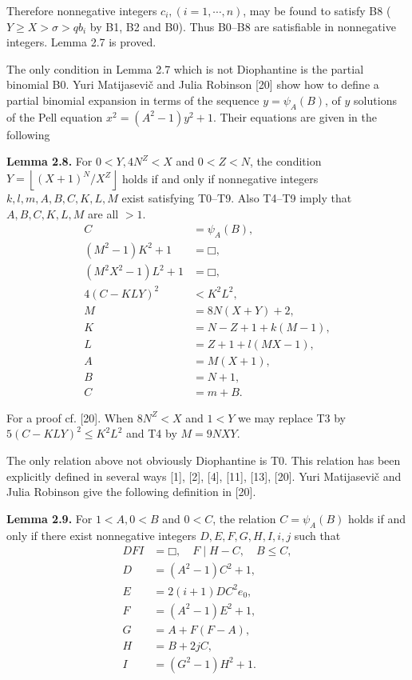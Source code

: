 \documentclass[11pt,a4paper]{article}
\newcommand{\square}{\mdlgwhtsquare}
\begin{document}
Therefore nonnegative integers $c_{i},(i=1, \cdots, n)$, may be found to satisfy B8 ( $Y \geq X>\sigma>q b_{i}$ by B1, B2 and B0). Thus B0--B8 are satisfiable in nonnegative integers. Lemma 2.7 is proved.

The only condition in Lemma 2.7 which is not Diophantine is the partial binomial B0. Yuri Matijasevič and Julia Robinson [20] show how to define a partial binomial expansion in terms of the sequence $y=\psi_{A}(B)$, of $y$ solutions of the Pell equation $x^{2}=\left(A^{2}-1\right) y^{2}+1$. Their equations are given in the following

\par{}\medskip\noindent\textbf{Lemma 2.8.} For $0<Y, 4 N^{Z}<X$ and $0<Z<N$, the condition $Y=\left\lfloor (X+1)^N/X^Z\right\rfloor$ holds if and only if nonnegative integers $k, l, m, A, B, C, K, L, M$ exist satisfying T0--T9. Also T4--T9 imply that $A, B, C, K, L, M$ are all $>1$.
\begin{align*}
C&=\psi_A(B), \tag{T0}\\
(M^2-1)K^2+1&=\square, \tag{T1}\\
(M^2X^2-1)L^2+1&=\square, \tag{T2}\\
4(C-KLY)^2&<K^2L^2, \tag{T3}\\
M&=8N(X+Y)+2, \tag{T4}\\
K&=N-Z+1+k(M-1), \tag{T5}\\
L&=Z+1+l(MX-1), \tag{T6}\\
A&=M(X+1), \tag{T7}\\
B&=N+1, \tag{T8}\\
C&=m+B. \tag{T9}
\end{align*}

For a proof cf. [20]. When $8 N^{Z}<X$ and $1<Y$ we may replace T3 by $5(C-K L Y)^{2} \leq K^{2} L^{2}$ and T4 by $M=9 N X Y$.

The only relation above not obviously Diophantine is T0. This relation has been explicitly defined in several ways [1], [2], [4], [11], [13], [20]. Yuri Matijasevič and Julia Robinson give the following definition in [20].

\par{}\medskip\noindent\textbf{Lemma 2.9.} For $1<A, 0<B$ and $0<C$, the relation $C=\psi_{A}(B)$ holds if and only if there exist nonnegative integers $D, E, F, G, H, I, i, j$ such that
\begin{align*}
DFI&=\square,\quad F\mid H-C,\quad B\leq C, \tag{A1}\\
D&=(A^2-1)C^2+1, \tag{A2}\\
E&=2(i+1)DC^2e_0, \tag{A3}\\
F&=(A^2-1)E^2+1, \tag{A4}\\
G&=A+F(F-A), \tag{A5}\\
H&=B+2jC, \tag{A6}\\
I&=(G^2-1)H^2+1. \tag{A7}
\end{align*}
\end{document}
